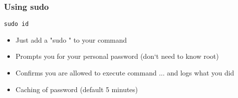 \begin{frame}[fragile]
	\frametitle{Using sudo}
	\begin{lstlisting}
sudo id
        \end{lstlisting}
  \begin{itemize}
    \item Just add a "sudo " to your command 
    \item Prompts you for your personal password (don`t need to know root)
    \item Confirms you are allowed to execute command ... and logs what you did
    \item Caching of password (default 5 minutes)
  \end{itemize} 

\end{frame}

